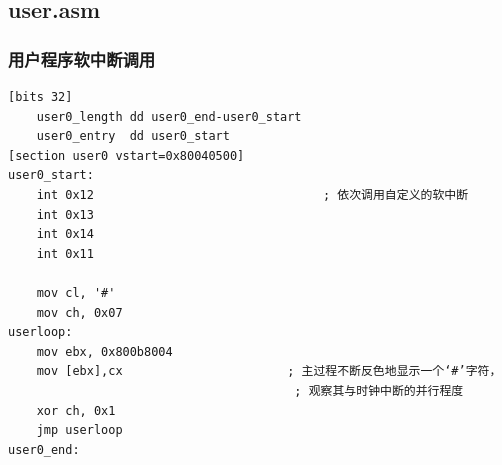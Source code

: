 \documentclass[a4paper,11pt,UTF8]{ctexart}
\begin{document}
	\subsection{user.asm}
		\subsubsection{用户程序软中断调用}
	\begin{lstlisting}[caption={user0 asm},tabsize=4,basicstyle=\footnotesize,captionpos=b]
[bits 32]
	user0_length dd user0_end-user0_start
	user0_entry  dd user0_start
[section user0 vstart=0x80040500]
user0_start:
	int 0x12                                ; 依次调用自定义的软中断
	int 0x13
	int 0x14
	int 0x11

	mov cl, '#'
	mov ch, 0x07
userloop:
	mov ebx, 0x800b8004
	mov [ebx],cx                       ; 主过程不断反色地显示一个‘#’字符，
										; 观察其与时钟中断的并行程度
	xor ch, 0x1
	jmp userloop
user0_end:
	\end{lstlisting}
	
		
\end{document}
